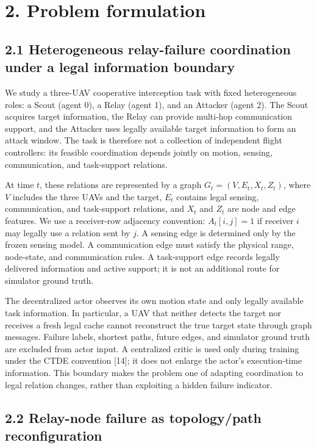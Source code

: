 \section{2. Problem formulation}

\subsection{2.1 Heterogeneous relay-failure coordination under a legal information boundary}

We study a three-UAV cooperative interception task with fixed heterogeneous roles: a Scout (agent 0), a Relay (agent 1), and an Attacker (agent 2). The Scout acquires target information, the Relay can provide multi-hop communication support, and the Attacker uses legally available target information to form an attack window. The task is therefore not a collection of independent flight controllers: its feasible coordination depends jointly on motion, sensing, communication, and task-support relations.

At time \(t\), these relations are represented by a graph \(G_t=(V,E_t,X_t,Z_t)\), where \(V\) includes the three UAVs and the target, \(E_t\) contains legal sensing, communication, and task-support relations, and \(X_t\) and \(Z_t\) are node and edge features. We use a receiver-row adjacency convention: \(A_t[i,j]=1\) if receiver \(i\) may legally use a relation sent by \(j\). A sensing edge is determined only by the frozen sensing model. A communication edge must satisfy the physical range, node-state, and communication rules. A task-support edge records legally delivered information and active support; it is not an additional route for simulator ground truth.

The decentralized actor observes its own motion state and only legally available task information. In particular, a UAV that neither detects the target nor receives a fresh legal cache cannot reconstruct the true target state through graph messages. Failure labels, shortest paths, future edges, and simulator ground truth are excluded from actor input. A centralized critic is used only during training under the CTDE convention [14]; it does not enlarge the actor's execution-time information. This boundary makes the problem one of adapting coordination to legal relation changes, rather than exploiting a hidden failure indicator.

\subsection{2.2 Relay-node failure as topology/path reconfiguration}

